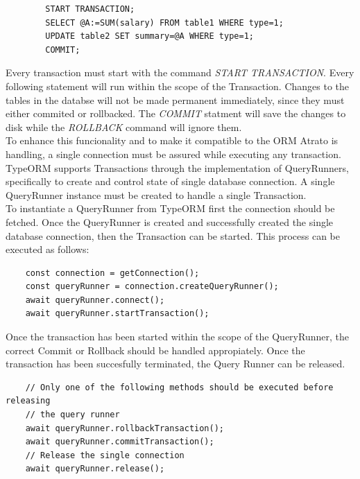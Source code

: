 \begin{center}
    \begin{verbatim}
        START TRANSACTION;
        SELECT @A:=SUM(salary) FROM table1 WHERE type=1;
        UPDATE table2 SET summary=@A WHERE type=1;
        COMMIT;
    \end{verbatim}
\end{center}

Every transaction must start with the command \textit{START TRANSACTION}. Every following statement will run within the scope of the Transaction. Changes to the tables in the databse will not be made permanent immediately, since they must either commited or rollbacked. The \textit{COMMIT} statment will save the changes to disk while the \textit{ROLLBACK} command will ignore them. \cite{mysqldocs}\\

To enhance this funcionality and to make it compatible to the ORM Atrato is handling, a single connection must be assured while executing any transaction. TypeORM supports Transactions through the implementation of QueryRunners, specifically to create and control state of single database connection. A single QueryRunner instance must be created to handle a single Transaction.\cite{typeorm}\\ 

To instantiate a QueryRunner from TypeORM first the connection should be fetched. Once the QueryRunner is created and successfully created the single database connection, then the Transaction can be started. This process can be executed as follows:

\begin{verbatim}
    const connection = getConnection();
    const queryRunner = connection.createQueryRunner();
    await queryRunner.connect();
    await queryRunner.startTransaction();
\end{verbatim}

Once the transaction has been started within the scope of the QueryRunner, the correct Commit or Rollback should be handled appropiately. Once the transaction has been succesfully terminated, the Query Runner can be released.\cite{typeorm}

\begin{verbatim}
    // Only one of the following methods should be executed before releasing
    // the query runner
    await queryRunner.rollbackTransaction();
    await queryRunner.commitTransaction();
    // Release the single connection
    await queryRunner.release();
\end{verbatim}

